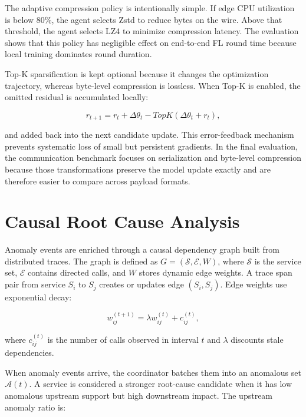 The adaptive compression policy is intentionally simple. If edge CPU utilization
is below 80\%, the agent selects Zstd to reduce bytes on the wire. Above that
threshold, the agent selects LZ4 to minimize compression latency. The evaluation
shows that this policy has negligible effect on end-to-end FL round time because
local training dominates round duration.

Top-K sparsification is kept optional because it changes the optimization
trajectory, whereas byte-level compression is lossless. When Top-K is enabled,
the omitted residual is accumulated locally:

\begin{equation}
    r_{t+1} = r_t + \Delta\theta_t - TopK(\Delta\theta_t + r_t),
    \label{eq:error_feedback}
\end{equation}

and added back into the next candidate update. This error-feedback mechanism
prevents systematic loss of small but persistent gradients. In the final
evaluation, the communication benchmark focuses on serialization and byte-level
compression because those transformations preserve the model update exactly and
are therefore easier to compare across payload formats.

\section{Causal Root Cause Analysis}
\label{sec:rca_graphs}

Anomaly events are enriched through a causal dependency graph built from
distributed traces. The graph is defined as
$G=(\mathcal{S},\mathcal{E},W)$, where $\mathcal{S}$ is the service set,
$\mathcal{E}$ contains directed calls, and $W$ stores dynamic edge weights. A
trace span pair from service $S_i$ to $S_j$ creates or updates edge
$(S_i,S_j)$. Edge weights use exponential decay:

\begin{equation}
    w_{ij}^{(t+1)} = \lambda w_{ij}^{(t)} + c_{ij}^{(t)},
    \label{eq:edge_decay}
\end{equation}

where $c_{ij}^{(t)}$ is the number of calls observed in interval $t$ and
$\lambda$ discounts stale dependencies.

When anomaly events arrive, the coordinator batches them into an anomalous set
$\mathcal{A}(t)$. A service is considered a stronger root-cause candidate when
it has low anomalous upstream support but high downstream impact. The upstream
anomaly ratio is:

